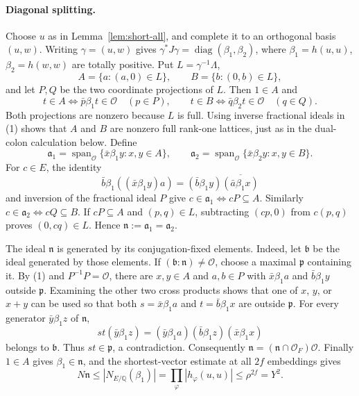 \paragraph{Diagonal splitting.} Choose $u$ as in
Lemma~\ref{lem:short-all}, and complete it to an orthogonal basis $(u,w)$.
Writing $\gamma=(u,w)$ gives
$\gamma^*J\gamma=\operatorname{diag}(\beta_1,\beta_2)$, where
$\beta_1=h(u,u)$, $\beta_2=h(w,w)$ are totally positive. Put
$L=\gamma^{-1}\Lambda$,
\[
A=\{a:(a,0)\in L\},\qquad B=\{b:(0,b)\in L\},
\]
and let $P,Q$ be the two coordinate projections of $L$. Then $1\in A$ and
\[
t\in A\iff\bar p\beta_1t\in\mathcal O\quad(p\in P),\qquad
t\in B\iff\bar q\beta_2t\in\mathcal O\quad(q\in Q).
\tag{1}
\]
Both projections are nonzero because $L$ is full. Using inverse fractional
ideals in (1) shows that $A$ and $B$ are nonzero full rank-one lattices, just
as in the dual-colon calculation below. Define
\[
\mathfrak a_1=\operatorname{span}_{\mathcal O}
\{\bar x\beta_1y:x,y\in A\},\qquad
\mathfrak a_2=\operatorname{span}_{\mathcal O}
\{\bar x\beta_2y:x,y\in B\}.
\]
For $c\in E$, the identity
\[
\bar b\beta_1((\bar x\beta_1y)a)
=(\bar b\beta_1y)\overline{(\bar a\beta_1x)}
\]
and inversion of the fractional ideal $P$ give
$c\in\mathfrak a_1\iff cP\subseteq A$. Similarly
$c\in\mathfrak a_2\iff cQ\subseteq B$. If $cP\subseteq A$ and $(p,q)\in L$,
subtracting $(cp,0)$ from $c(p,q)$ proves $(0,cq)\in L$. Hence
$\mathfrak n:=\mathfrak a_1=\mathfrak a_2$.

The ideal $\mathfrak n$ is generated by its conjugation-fixed elements. Indeed,
let $\mathfrak b$ be the ideal generated by those elements. If
$(\mathfrak b:\mathfrak n)\neq\mathcal O$, choose a maximal $\mathfrak p$
containing it. By (1) and $P^{-1}P=\mathcal O$, there are $x,y\in A$ and
$a,b\in P$ with $\bar x\beta_1a$ and $\bar b\beta_1y$ outside $\mathfrak p$.
Examining the other two cross products shows that one of $x$, $y$, or $x+y$
can be used so that both
$s=\bar x\beta_1a$ and $t=\bar b\beta_1x$ are outside $\mathfrak p$. For every
generator $\bar y\beta_1z$ of $\mathfrak n$,
\[
st(\bar y\beta_1z)=(\bar y\beta_1a)(\bar b\beta_1z)(\bar x\beta_1x)
\]
belongs to $\mathfrak b$. Thus $st\in\mathfrak p$, a contradiction.
Consequently $\mathfrak n=(\mathfrak n\cap\mathcal O_F)\mathcal O$.
Finally $1\in A$ gives $\beta_1\in\mathfrak n$, and the shortest-vector
estimate at all $2f$ embeddings gives
\[
N\mathfrak n\leq|N_{E/\mathbb Q}(\beta_1)|
=\prod_\varphi|h_\varphi(u,u)|\leq\rho^{2f}=Y^2.
\tag{2}
\]

